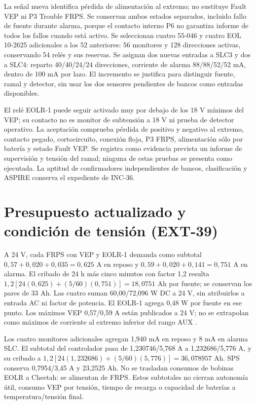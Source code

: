 La señal nueva identifica pérdida de alimentación al extremo; no sustituye Fault VEP ni P3 Trouble FRPS. Se conservan ambos estados separados, incluido fallo de fuente durante alarma, porque el contacto interno P6 no garantiza informe de todos los fallos cuando está activo. Se seleccionan cuatro 55-046 y cuatro EOL 10-2625 adicionales a los 52 anteriores: 56 monitores y 128 direcciones activas, conservando 54 relés y sus reservas. Se asignan dos nuevas entradas a SLC3 y dos a SLC4: reparto 40/40/24/24 direcciones, corriente de alarma 88/88/52/52 mA, dentro de 100 mA por lazo. El incremento se justifica para distinguir fuente, ramal y detector, sin usar los dos sensores pendientes de bancos como entradas disponibles.

El relé EOLR-1 puede seguir activado muy por debajo de los 18 V mínimos del VEP; su contacto no es monitor de subtensión a 18 V ni prueba de detector operativo. La aceptación comprueba pérdida de positivo y negativo al extremo, contacto pegado, cortocircuito, conexión floja, P3 FRPS, alimentación sólo por batería y estado Fault VEP. Se registra como evidencia prevista un informe de supervisión y tensión del ramal; ninguna de estas pruebas se presenta como ejecutada. La aptitud de confirmadores independientes de bancos, clasificación y ASPIRE conserva el expediente de INC-36.

\section{Presupuesto actualizado y condición de tensión (EXT-39)}
\label{sec:sd4-ext39}
A 24 V, cada FRPS con VEP y EOLR-1 demanda como subtotal $0,57+0,020+0,035=0,625$ A en reposo y $0,59+0,020+0,141=0,751$ A en alarma. El cribado de 24 h más cinco minutos con factor 1,2 resulta $1,2[24(0,625)+(5/60)(0,751)]=18,0751$ Ah por fuente; se conservan los pares de 33 Ah. Las cuatro suman 60,00/72,096 W DC a 24 V, sin atribuirlos a entrada AC ni factor de potencia. El EOLR-1 agrega 0,48 W por fuente en ese punto. Los máximos VEP 0,57/0,59 A están publicados a 24 V; no se extrapolan como máximos de corriente al extremo inferior del rango AUX \parencite{lote39-eolr1}\parencite[p.~2]{lote30-vep36106}.

Los cuatro monitores adicionales agregan 1,940 mA en reposo y 8 mA en alarma SLC. El subtotal del controlador pasa de 1,230746/5,768 A a 1,232686/5,776 A, y su cribado a $1,2[24(1,232686)+(5/60)(5,776)]=36,078957$ Ah. SPS conserva 0,7954/3,45 A y 23,2525 Ah. No se trasladan consumos de bobinas EOLR a Cheetah: se alimentan de FRPS. Estos subtotales no cierran autonomía útil, consumo VEP por tensión, tiempo de recarga o capacidad de baterías a temperatura/tensión final.

